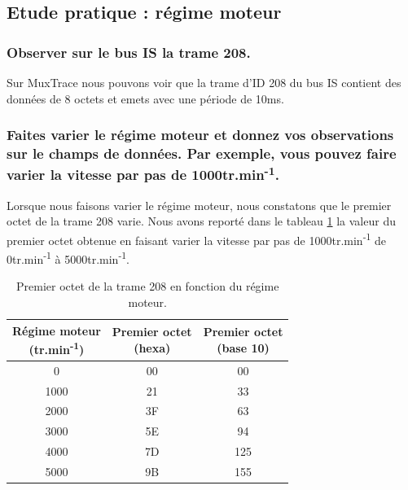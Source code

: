 \documentclass{rapportECC}
\begin{document}

\subsection{Etude pratique : régime moteur}

\subsubsection*{Observer sur le bus IS la trame 208.}

Sur MuxTrace nous pouvons voir que la trame d'ID 208 du bus IS contient des données de 8 octets et emets avec une période de 10ms.

\subsubsection*{Faites varier le régime moteur et donnez vos observations sur le champs de données. Par exemple, vous pouvez faire varier la vitesse par pas de 1000tr.min\textsuperscript{-1}.}

Lorsque nous faisons varier le régime moteur, nous constatons que le premier octet de la trame 208 varie. Nous avons reporté dans le tableau \ref{tab:regime_moteur_trame_208} la valeur du premier octet obtenue en faisant varier la vitesse par pas de 1000tr.min\textsuperscript{-1} de 0tr.min\textsuperscript{-1} à 5000tr.min\textsuperscript{-1}.

\begingroup
\begin{table}[H]
    \centering
    \begin{tabular}{c c c}
        \toprule
        \makecell{\textbf{Régime moteur}\\ \textbf{(tr.min\textsuperscript{-1})}} & \makecell{\textbf{Premier octet}\\ \textbf{(hexa)}} & \makecell{\textbf{Premier octet}\\ \textbf{(base 10)}} \\
        \midrule
        0    & 00 & 00 \\
        1000 & 21 & 33 \\
        2000 & 3F & 63 \\
        3000 & 5E & 94 \\
        4000 & 7D & 125 \\
        5000 & 9B & 155 \\
        \bottomrule
    \end{tabular}
    \caption{Premier octet de la trame 208 en fonction du régime moteur.}
    \label{tab:regime_moteur_trame_208}
\end{table}
\endgroup
\end{document}
